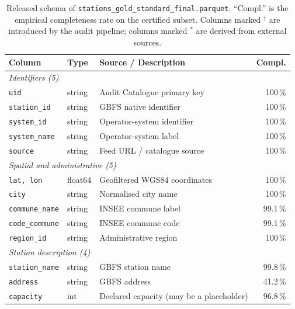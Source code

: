 \documentclass[11pt,a4paper]{article}
\begin{document}
\begin{table}[ht]
\centering
\caption{Released schema of \texttt{stations\_gold\_standard\_final.parquet}.
``Compl.'' is the empirical completeness rate on the certified subset.
Columns marked $^\dag$ are introduced by the audit pipeline; columns
marked $^\ast$ are derived from external sources.}
\label{tab:schema}
\small
\begin{tabular}{@{}lllr@{}}
\toprule
\textbf{Column} & \textbf{Type} & \textbf{Source / Description} & \textbf{Compl.}\\
\midrule
\multicolumn{4}{l}{\textit{Identifiers (5)}}\\
\quad\texttt{uid}              & string  & Audit Catalogue primary key                 & 100\,\%\\
\quad\texttt{station\_id}       & string  & GBFS native identifier                    & 100\,\%\\
\quad\texttt{system\_id}        & string  & Operator-system identifier                & 100\,\%\\
\quad\texttt{system\_name}      & string  & Operator-system label                     & 100\,\%\\
\quad\texttt{source}            & string  & Feed URL / catalogue source               & 100\,\%\\
\midrule
\multicolumn{4}{l}{\textit{Spatial and administrative (5)}}\\
\quad\texttt{lat, lon}           & float64 & Geofiltered WGS84 coordinates             & 100\,\%\\
\quad\texttt{city}               & string  & Normalised city name                      & 100\,\%\\
\quad\texttt{commune\_name}      & string  & INSEE commune label                       & 99.1\,\%\\
\quad\texttt{code\_commune}      & string  & INSEE commune code                        & 99.1\,\%\\
\quad\texttt{region\_id}         & string  & Administrative region                     & 100\,\%\\
\midrule
\multicolumn{4}{l}{\textit{Station description (4)}}\\
\quad\texttt{station\_name}      & string  & GBFS station name                         & 99.8\,\%\\
\quad\texttt{address}            & string  & GBFS address                              & 41.2\,\%\\
\quad\texttt{capacity}           & int     & Declared capacity (may be a placeholder)   & 96.8\,\%\\

\end{tabular}
\end{table}
\end{document}
